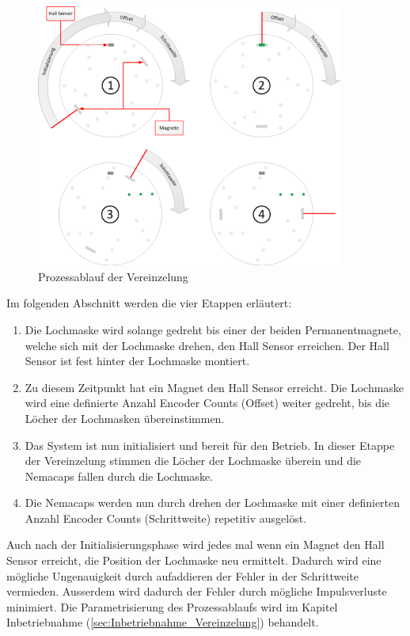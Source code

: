 \begin{figure}[H]
	\includegraphics[width=0.9\textwidth]{Illustrationen/6-Umsetzung/Prozessablauf_Vereinzelung.png}
	\caption{Prozessablauf der Vereinzelung}
	\label{fig:Ansteuerung_Vereinzelung}
\end{figure}

Im folgenden Abschnitt werden die vier Etappen erläutert:

\begin{enumerate}
	\item Die Lochmaske wird solange gedreht bis einer der beiden Permanentmagnete, welche sich mit der Lochmaske drehen, den Hall Sensor erreichen. Der Hall Sensor ist fest hinter der Lochmaske montiert.
 	\item Zu diesem Zeitpunkt hat ein Magnet den Hall Sensor erreicht. Die Lochmaske wird eine definierte Anzahl Encoder Counts (Offset) weiter gedreht, bis die Löcher der Lochmasken übereinstimmen.
 	\item Das System ist nun initialisiert und bereit für den Betrieb. In dieser Etappe der Vereinzelung stimmen die Löcher der Lochmaske überein und die Nemacaps fallen durch die Lochmaske. 
	\item Die Nemacaps werden nun durch drehen der Lochmaske mit einer definierten Anzahl Encoder Counts (Schrittweite) repetitiv ausgelöst.
\end{enumerate}

Auch nach der Initialisierungsphase wird jedes mal wenn ein Magnet den Hall Sensor erreicht, die Position der Lochmaske neu ermittelt. Dadurch wird eine mögliche Ungenauigkeit durch aufaddieren der Fehler in der Schrittweite vermieden. Ausserdem wird dadurch der Fehler durch mögliche Impulsverluste minimiert. Die Parametrisierung des Prozessablaufs wird im Kapitel Inbetriebnahme (\ref{sec:Inbetriebnahme_Vereinzelung}) behandelt. 